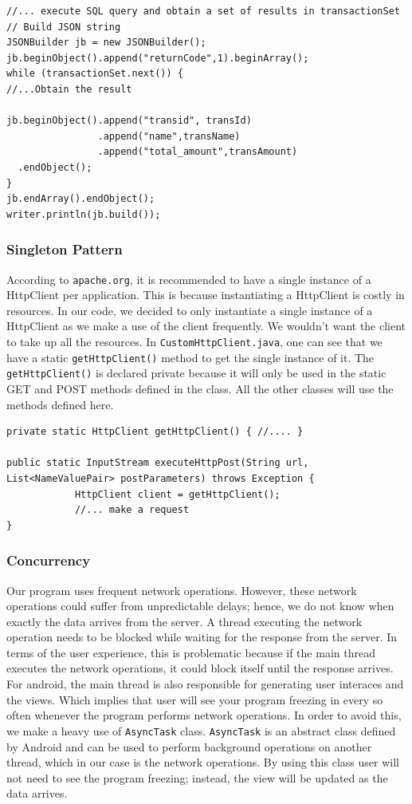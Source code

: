 \documentclass[a4paper,11pt]{article}
\begin{document}
\begin{verbatim}
//... execute SQL query and obtain a set of results in transactionSet
// Build JSON string
JSONBuilder jb = new JSONBuilder();
jb.beginObject().append("returnCode",1).beginArray();
while (transactionSet.next()) {
//...Obtain the result
						
jb.beginObject().append("transid", transId)
                .append("name",transName)
                .append("total_amount",transAmount)
  .endObject();
}
jb.endArray().endObject();			
writer.println(jb.build());
\end{verbatim}

\subsubsection*{Singleton Pattern}

According to \texttt{apache.org}, it is recommended to have a single instance of a HttpClient per application. This is because instantiating a HttpClient is costly in resources. In our code, we decided to only instantiate a single instance of a HttpClient as we make a use of the client frequently. We wouldn't want the client to take up all the resources. In \texttt{CustomHttpClient.java}, one can see that we have a static \texttt{getHttpClient()} method to get the single instance of it. The \texttt{getHttpClient()} is declared private because it will only be used in the static GET and POST methods defined in the class. All the other classes will use the methods defined here. 

\begin{verbatim}
private static HttpClient getHttpClient() { //.... }

public static InputStream executeHttpPost(String url, 
List<NameValuePair> postParameters) throws Exception {
            HttpClient client = getHttpClient();
            //... make a request
}  
\end{verbatim} 

\subsubsection*{Concurrency}

Our program uses frequent network operations. However, these network operations could suffer from unpredictable delays; hence, we do not know when exactly the data arrives from the server. A thread executing the network operation needs to be blocked while waiting for the response from the server. In terms of the user experience, this is problematic because if the main thread executes the network operations, it could block itself until the response arrives. For android, the main thread is also responsible for generating user interaces and the views. Which implies that user will see your program freezing in every so often whenever the program performs network operations. In order to avoid this, we make a heavy use of \texttt{AsyncTask} class. \texttt{AsyncTask} is an abstract class defined by Android and can be used to perform background operations on another thread, which in our case is the network operations. By using this class user will not need to see the program freezing; instead, the view will be updated as the data arrives.     
 
\end{document}
